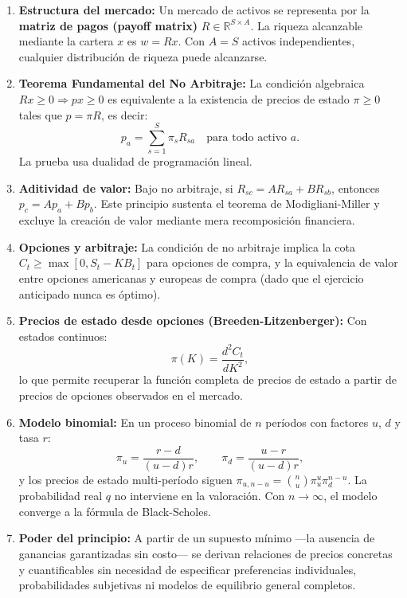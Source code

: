 \documentclass[12pt]{article}
\begin{document}
\begin{enumerate}
  \item \textbf{Estructura del mercado:} Un mercado de activos se representa por la \textbf{matriz de pagos (payoff matrix)} $R \in \mathbb{R}^{S \times A}$. La riqueza alcanzable mediante la cartera $x$ es $w = Rx$. Con $A = S$ activos independientes, cualquier distribuci\'on de riqueza puede alcanzarse.

  \item \textbf{Teorema Fundamental del No Arbitraje:} La condici\'on algebraica $Rx \geq 0 \Rightarrow px \geq 0$ es equivalente a la existencia de precios de estado $\pi \geq 0$ tales que $p = \pi R$, es decir:
  \[
    p_a = \sum_{s=1}^{S} \pi_s R_{sa} \quad \text{para todo activo } a.
  \]
  La prueba usa dualidad de programaci\'on lineal.

  \item \textbf{Aditividad de valor:} Bajo no arbitraje, si $R_{sc} = AR_{sa} + BR_{sb}$, entonces $p_c = Ap_a + Bp_b$. Este principio sustenta el teorema de Modigliani-Miller y excluye la creaci\'on de valor mediante mera recomposici\'on financiera.

  \item \textbf{Opciones y arbitraje:} La condici\'on de no arbitraje implica la cota $C_t \geq \max[0, S_t - KB_t]$ para opciones de compra, y la equivalencia de valor entre opciones americanas y europeas de compra (dado que el ejercicio anticipado nunca es \'optimo).

  \item \textbf{Precios de estado desde opciones (Breeden-Litzenberger):} Con estados continuos:
  \[
    \pi(K) = \frac{d^2 C_t}{dK^2},
  \]
  lo que permite recuperar la funci\'on completa de precios de estado a partir de precios de opciones observados en el mercado.

  \item \textbf{Modelo binomial:} En un proceso binomial de $n$ per\'iodos con factores $u$, $d$ y tasa $r$:
  \[
    \pi_u = \frac{r - d}{(u-d)r}, \qquad \pi_d = \frac{u - r}{(u-d)r},
  \]
  y los precios de estado multi-per\'iodo siguen $\pi_{u,n-u} = \binom{n}{u}\pi_u^u \pi_d^{n-u}$. La probabilidad real $q$ no interviene en la valoraci\'on. Con $n \to \infty$, el modelo converge a la f\'ormula de Black-Scholes.

  \item \textbf{Poder del principio:} A partir de un supuesto m\'inimo ---la ausencia de ganancias garantizadas sin costo--- se derivan relaciones de precios concretas y cuantificables sin necesidad de especificar preferencias individuales, probabilidades subjetivas ni modelos de equilibrio general completos.
\end{enumerate}
\end{document}
